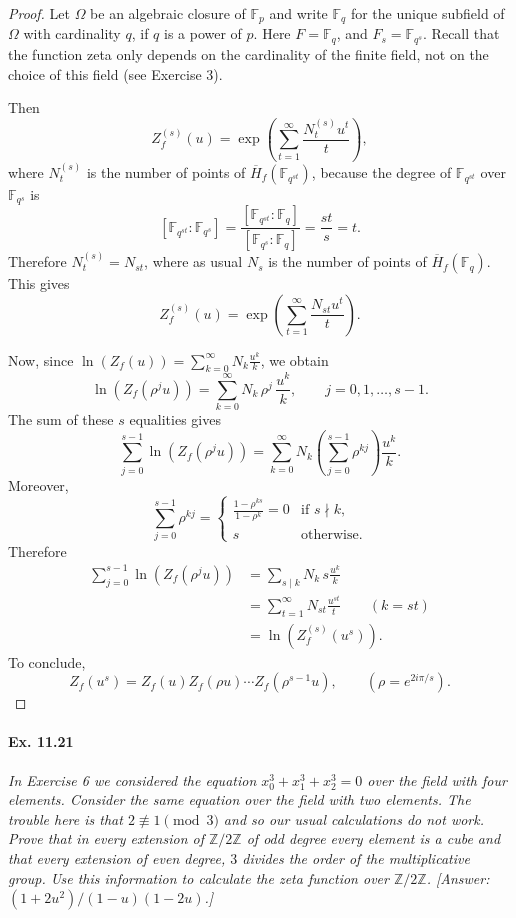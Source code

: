 \documentclass[11pt,a4paper]{article}
\newcommand{\Z}{\mathbb{Z}}
\newcommand{\F}{\mathbb{F}}
\begin{document}
\begin{proof}
Let $\Omega$ be an algebraic closure of $\F_p$ and write $\F_q$ for the unique subfield of $\Omega$ with cardinality $q$, if $q$ is a power of $p$. Here $F = \F_q$, and $F_s = \F_{q^s}$. Recall that the function zeta only depends on the cardinality of the finite field, not on the choice of this field (see Exercise 3).

Then 
$$Z_f^{(s)}(u) = \exp \left( \sum_{t=1}^\infty \frac{N_t^{(s)} u^t}{t} \right),$$
where $N_t^{(s)}$ is the number of points of $\overline{H}_f(\F_{q^{st}})$, because the degree of $\F_{q^{st}}$ over $\F_{q^s}$ is
$$[\F_{q^{st}} : \F_{q^s}] = \frac{[\F_{q^{st}} : \F_q]}{[\F_{q^s} : \F_q]} = \frac{st}{s} = t.$$
 Therefore $N_t^{(s)} = N_{st}$,  where as usual $N_s$ is the number of points of $\overline{H}_f(\F_q)$. This gives
$$Z_f^{(s)}(u) = \exp \left( \sum_{t=1}^\infty \frac{N_{st} u^t}{t} \right).$$

Now, since $\ln(Z_f(u)) = \sum\limits_{k=0}^\infty N_k \frac{u^k}{k}$, we obtain
$$\ln(Z_f(\rho^j u)) = \sum_{k=0}^\infty N_k\, \rho^j \, \frac{u^k}{k},\qquad j = 0,1,\ldots,s-1.$$
The sum of these $s$ equalities gives
$$\sum_{j=0}^{s-1} \ln(Z_f(\rho^j u)) = \sum_{k=0}^\infty N_k \left( \sum_{j=0}^{s-1} \rho^{kj} \right) \frac{u^k}{k}.$$
Moreover,
$$
 \sum_{j=0}^{s-1} \rho^{kj} =
\left\{
\begin{array}{ll}
\frac{1 - \rho^{ks}}{1-\rho^k} = 0 & \text{if } s \nmid k,\\
 s & \text{otherwise.}
\end{array}
\right.
$$
Therefore
\begin{align*}
\sum_{j=0}^{s-1} \ln(Z_f(\rho^j u)) &= \sum_{s \mid k} N_k \, s \frac{u^k}{k}\\
&= \sum_{t = 1}^\infty  N_{st} \frac{u^{st}}{t}\qquad (k = st)\\
&=\ln(Z_f^{(s)}(u^s)).
\end{align*}
To conclude,
$$Z_f(u^s) = Z_f(u) Z_f(\rho u) \cdots Z_f(\rho^{s-1} u),\qquad (\rho = e^{2i\pi/s}).$$
\end{proof}


\paragraph{Ex. 11.21}{\it In Exercise 6 we considered the equation $x_0^3 + x_1^3 + x_2^3 = 0$ over the field with four elements. Consider the same equation over the field with two elements. The trouble here is that $2 \not \equiv 1 \pmod 3$ and so our usual calculations do not work. Prove that in every extension of $\Z/2\Z$ of odd degree every element is a cube and that every extension of even degree, $3$ divides the order of the multiplicative group. Use this information to calculate the zeta function over $\Z/2\Z$. [Answer: $(1+ 2u^2)/(1-u)(1-2u)$.]
}
\end{document}
